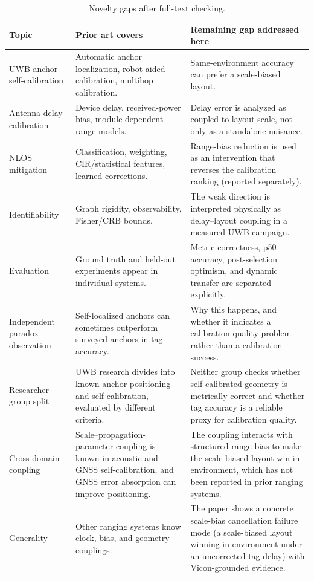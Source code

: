\documentclass[11pt,a4paper]{article}
\begin{document}
\begin{table}[h]
\centering
\caption{Novelty gaps after full-text checking.}
\small
\begin{tabular}{@{}p{36mm}p{49mm}p{49mm}@{}}
\toprule
Topic & Prior art covers & Remaining gap addressed here \\
\midrule
UWB anchor self-calibration & Automatic anchor localization, robot-aided calibration, multihop calibration. & Same-environment accuracy can prefer a scale-biased layout. \\
Antenna delay calibration & Device delay, received-power bias, module-dependent range models. & Delay error is analyzed as coupled to layout scale, not only as a standalone nuisance. \\
NLOS mitigation & Classification, weighting, CIR/statistical features, learned corrections. & Range-bias reduction is used as an intervention that reverses the calibration ranking (reported separately). \\
Identifiability & Graph rigidity, observability, Fisher/CRB bounds. & The weak direction is interpreted physically as delay--layout coupling in a measured UWB campaign. \\
Evaluation & Ground truth and held-out experiments appear in individual systems. & Metric correctness, p50 accuracy, post-selection optimism, and dynamic transfer are separated explicitly. \\
Independent paradox observation & Self-localized anchors can sometimes outperform surveyed anchors in tag accuracy. & Why this happens, and whether it indicates a calibration quality problem rather than a calibration success. \\
Researcher-group split & UWB research divides into known-anchor positioning and self-calibration, evaluated by different criteria. & Neither group checks whether self-calibrated geometry is metrically correct and whether tag accuracy is a reliable proxy for calibration quality. \\
Cross-domain coupling & Scale--propagation-parameter coupling is known in acoustic and GNSS self-calibration, and GNSS error absorption can improve positioning. & The coupling interacts with structured range bias to make the scale-biased layout win in-environment, which has not been reported in prior ranging systems. \\
Generality & Other ranging systems know clock, bias, and geometry couplings. & The paper shows a concrete scale-bias cancellation failure mode (a scale-biased layout winning in-environment under an uncorrected tag delay) with Vicon-grounded evidence. \\
\bottomrule
\end{tabular}
\end{table}
\end{document}
